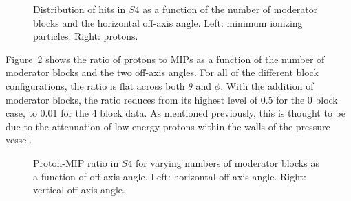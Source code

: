 \begin{figure}[!ht]
  \begin{minipage}[t]{0.48\textwidth}
    \begin{adjustbox}{max totalsize={\textwidth}{.35\textheight},center}
      
    \end{adjustbox}
    
  \end{minipage}
  \hspace{0.3cm}
  \begin{minipage}[t]{0.48\textwidth}
    \begin{adjustbox}{max totalsize={\textwidth}{.35\textheight},center}
      
    \end{adjustbox}
  \end{minipage} 
  \caption{\label{fig:thetas4mip}Distribution of hits in $\mathit{S4}$ as a function of the number of moderator blocks and the horizontal off-axis angle. Left: minimum ionizing particles. Right: protons.}
\end{figure}	

Figure~\ref{fig:propiratio_s4_horz} shows the ratio of protons to MIPs as a function of the number of moderator blocks and the two off-axis angles.
For all of the different block configurations, the ratio is flat across both $\theta$ and $\phi$.
With the addition of moderator blocks, the ratio reduces from its highest level of 0.5 for the 0 block case, to 0.01 for the 4 block data.
As mentioned previously, this is thought to be due to the attenuation of low energy protons within the walls of the pressure vessel.

\begin{figure}[!ht]
  \begin{minipage}[t]{0.48\textwidth}
    \begin{adjustbox}{max totalsize={\textwidth}{.35\textheight}, center}
      
    \end{adjustbox}
  \end{minipage}
  \hspace{0.3cm}
  \begin{minipage}[t]{0.48\textwidth}
    \begin{adjustbox}{max totalsize={\textwidth}{.35\textheight}, center}
      
    \end{adjustbox}
  \end{minipage}	
  \caption{\label{fig:propiratio_s4_horz}Proton-MIP ratio in $\mathit{S4}$ for varying numbers of moderator blocks as a function of off-axis angle. Left: horizontal off-axis angle. Right: vertical off-axis angle.}
\end{figure}

